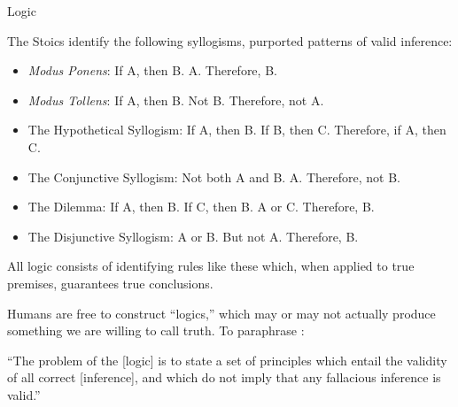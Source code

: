\documentclass[8pt]{beamer}\usepackage[]{graphicx}\usepackage[]{color}
\begin{document}
\begin{frame}{Logic}

%
The Stoics identify the following syllogisms, purported patterns of
valid inference:
%
\begin{itemize}
%
\item \emph{Modus Ponens}: If A, then B.  A.  Therefore, B.
\item \emph{Modus Tollens}: If A, then B.  Not B.  Therefore, not A.
\item The Hypothetical Syllogism: If A, then B.  If B, then C.  Therefore, if A, then C.
\item The Conjunctive Syllogism: Not both A and B.  A.  Therefore, not B.
\item The Dilemma: If A, then B.  If C, then B.  A or C.  Therefore, B.
\item The Disjunctive Syllogism: A or B.  But not A.  Therefore, B.
%
\end{itemize}
%
All logic consists of identifying rules like these which, when applied to
true premises, guarantees true conclusions.

Humans are free to construct ``logics,'' which may
or may not actually produce something we are willing to call truth.  To
paraphrase \cite{hacking:2016:logic}:

\begin{block}{}
%
``The problem of the [logic] is to state a set of principles
which entail the validity of all correct [inference], and which do not
imply that any fallacious inference is valid.''
%
\end{block}
%
\end{frame}


\end{document}
